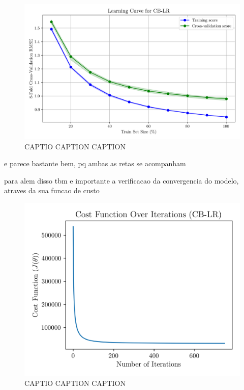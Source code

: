 \documentclass[conference]{IEEEtran}
\begin{document}
\begin{figure}[H]
    \centering
    \includegraphics[width=1\linewidth]{assets/model02_learning_curve.png}
    \caption{CAPTIO CAPTION CAPTION}
    \label{fig:model02_learning_curve}
\end{figure}

e parece bastante bem, pq ambas as retas se acompanham

para alem disso tbm e importante a verificacao da convergencia do modelo, atraves da sua funcao de custo

\begin{figure}[H]
    \centering
    \includegraphics[width=1\linewidth]{assets/model02_cost_function.png}
    \caption{CAPTIO CAPTION CAPTION}
    \label{fig:model02_cost_function}
\end{figure}
\end{document}
